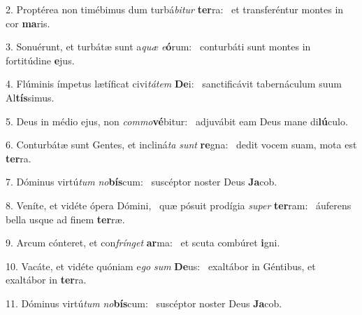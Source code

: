 2. Proptérea non timébimus dum turbá\textit{bi}\textit{tur} \textbf{ter}ra: \ast\  et transferéntur montes in cor \textbf{ma}ris.\

3. Sonuérunt, et turbátæ sunt a\textit{quæ} \textit{e}\textbf{ó}rum: \ast\  conturbáti sunt montes in fortitúdine \textbf{e}jus.\

4. Flúminis ímpetus lætíficat civi\textit{tá}\textit{tem} \textbf{De}i: \ast\  sanctificávit tabernáculum suum Al\textbf{tís}simus.\

5. Deus in médio ejus, non \textit{com}\textit{mo}\textbf{vé}bitur: \ast\  adjuvábit eam Deus mane di\textbf{lú}culo.\

6. Conturbátæ sunt Gentes, et incliná\textit{ta} \textit{sunt} \textbf{re}gna: \ast\  dedit vocem suam, mota est \textbf{ter}ra.\

7. Dóminus virtú\textit{tum} \textit{no}\textbf{bís}cum: \ast\  suscéptor noster Deus \textbf{Ja}cob.\

8. Veníte, et vidéte ópera Dómini, \dag\  quæ pósuit prodígia \textit{su}\textit{per} \textbf{ter}ram: \ast\  áuferens bella usque ad finem \textbf{ter}ræ.\

9. Arcum cónteret, et con\textit{frín}\textit{get} \textbf{ar}ma: \ast\  et scuta combúret \textbf{i}gni.\

10. Vacáte, et vidéte quóniam e\textit{go} \textit{sum} \textbf{De}us: \ast\  exaltábor in Géntibus, et exaltábor in \textbf{ter}ra.\

11. Dóminus virtú\textit{tum} \textit{no}\textbf{bís}cum: \ast\  suscéptor noster Deus \textbf{Ja}cob.\


